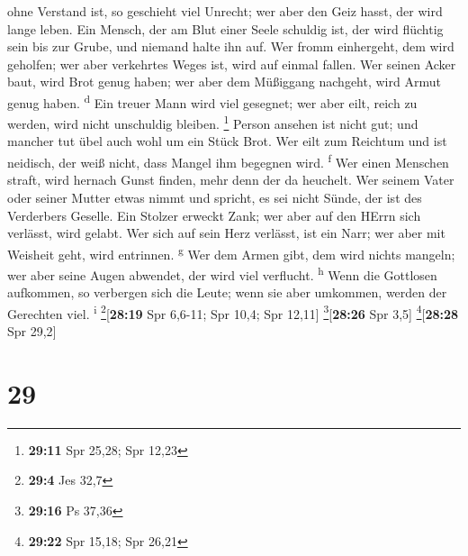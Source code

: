 ohne Verstand ist, so geschieht viel Unrecht; wer aber den Geiz hasst,
der wird lange leben.  Ein Mensch, der am Blut einer
Seele schuldig ist, der wird flüchtig sein bis zur Grube, und niemand
halte ihn auf.  Wer fromm einhergeht, dem wird geholfen;
wer aber verkehrtes Weges ist, wird auf einmal fallen. 
Wer seinen Acker baut, wird Brot genug haben; wer aber dem Müßiggang
nachgeht, wird Armut genug haben. \textsuperscript{d} 
Ein treuer Mann wird viel gesegnet; wer aber eilt, reich zu werden, wird
nicht unschuldig bleiben. \footnote{\textbf{29:11} Spr 25,28; Spr 12,23}
 Person ansehen ist nicht gut; und mancher tut übel auch
wohl um ein Stück Brot.  Wer eilt zum Reichtum und ist
neidisch, der weiß nicht, dass Mangel ihm begegnen wird.
\textsuperscript{f}  Wer einen Menschen straft, wird
hernach Gunst finden, mehr denn der da heuchelt.  Wer
seinem Vater oder seiner Mutter etwas nimmt und spricht, es sei nicht
Sünde, der ist des Verderbers Geselle.  Ein Stolzer
erweckt Zank; wer aber auf den HErrn sich verlässt, wird gelabt.
 Wer sich auf sein Herz verlässt, ist ein Narr; wer aber
mit Weisheit geht, wird entrinnen. \textsuperscript{g} 
Wer dem Armen gibt, dem wird nichts mangeln; wer aber seine Augen
abwendet, der wird viel verflucht. \textsuperscript{h} 
Wenn die Gottlosen aufkommen, so verbergen sich die Leute; wenn sie aber
umkommen, werden der Gerechten viel. \textsuperscript{i}
\footnote{\textbf{29:4} Jes 32,7}{[}\textbf{28:19} Spr 6,6-11; Spr 10,4;
Spr 12,11{]} \footnote{\textbf{29:16} Ps 37,36}{[}\textbf{28:26} Spr
3,5{]} \footnote{\textbf{29:22} Spr 15,18; Spr 26,21}{[}\textbf{28:28}
Spr 29,2{]}

\hypertarget{section-28}{%
\section{29}\label{section-28}}

